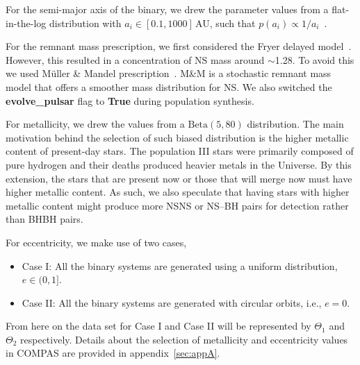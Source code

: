 \documentclass[twocolumn, twocolappendix]{aastex63}
\begin{document}
For the semi-major axis of the binary, we drew the parameter values from a flat-in-the-log distribution with $a_i \in [0.1, 1000]\,$AU, such that $p(a_i) \propto 1/a_i$~\citep{Opik1924}.

For the remnant mass prescription, we first considered the Fryer delayed model~\citep{Fryer2012}.
However, this resulted in a concentration of NS mass around $\sim$\SI{1.28}{\Msun}.
To avoid this we used Müller \& Mandel prescription~\citep[M\&M;][]{Mandel2020}.
M\&M is a stochastic remnant mass model that offers a smoother mass distribution for NS\@.
We also switched the \textbf{evolve\_pulsar} flag to \textbf{True} during population synthesis.

For metallicity, we drew the values from a $\text{Beta}(5, 80)$ distribution.
The main motivation behind the selection of such biased distribution is the higher metallic content of present-day stars.
The population III stars were primarily composed of pure hydrogen and their deaths produced heavier metals in the Universe.
By this extension, the stars that are present now or those that will merge now must have higher metallic content.
As such, we also speculate that having stars with higher metallic content might produce more NSNS or NS--BH pairs for detection rather than BHBH pairs.

For eccentricity, we make use of two cases,
\begin{itemize}
	\item Case I: All the binary systems are generated using a uniform distribution, $e \in (0, 1]$.
	\item Case II: All the binary systems are generated with circular orbits, i.e., $e = 0$.
\end{itemize}

From here on the data set for Case I and Case II will be represented by $\Theta_1$ and $\Theta_2$ respectively.
Details about the selection of metallicity and eccentricity values in COMPAS are provided in appendix~\ref{sec:appA}.
\end{document}
